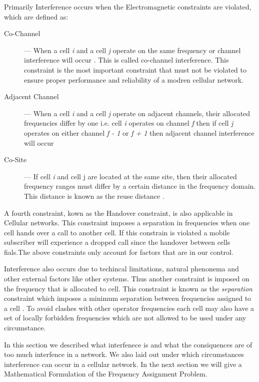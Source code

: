 Primarily Interference occurs when the Electromagnetic constraints are violated, which are defined as:
\begin{description}
\item[Co-Channel] --- When a cell \emph{i} and a cell \emph{j} operate on the same frequency or channel interference will occur \cite{Eisenblatter,EfficientEvoChannelManagement,Karen2004,ACOvsEA,InterferenceOrientatedFAP}. This is called co-channel interference. This constraint is the most important constraint that must not be violated to ensure proper performance and reliability of a modren cellular network\cite{EfficientEvoChannelManagement}.
\item[Adjacent Channel] --- When a cell \emph{i} and a cell \emph{j} operate on adjacent channels, their allocated frequencies differ by one i.e. cell \emph{i} operates on channel \emph{f} then if cell \emph{j} operates on either channel \emph{f - 1} or \emph{f + 1} then adjacent channel interference will occur \cite{Eisenblatter,EfficientEvoChannelManagement,Karen2004,ACOvsEA,InterferenceOrientatedFAP}
\item[Co-Site] --- If cell \emph{i} and cell {j} are located at the same site, then their allocated frequency ranges must differ by a certain distance in the frequency domain. This distance is known as the reuse distance \cite{FixedFAPPSO,EgyptFAPPSO}.
\end{description}
A fourth constraint, kown as the Handover constraint, is also applicable in Cellular networks. This constraint imposes a separation in frequencies when one cell hands over a call to another cell. If this constrain is violated a mobile subscriber will experience a dropped call since the handover between cells fials.The above constraints only account for factors that are in our control.

Interference also occurs due to techincal limitations, natural phenonema and other external factors like other systems. Thus another constraint is imposed on the frequency that is allocated to cell. This constraint is known as the \emph{separation} constraint which imposes a minimum separation between frequencies assigned to a cell \cite{Eisenblatter,InterferenceOrientatedFAP}. To avoid clashes with other operator frequencies each cell may also have a set of locally forbidden frequencies which are not allowed to be used under any circumstance.

In this section we described what interfenece is and what the consiquences are of too much interfence in a network. We also laid out under which circumstances interference can occur in a cellular network. In the next section we will give a Mathematical Formulation of the Frequency Assignment Problem.
